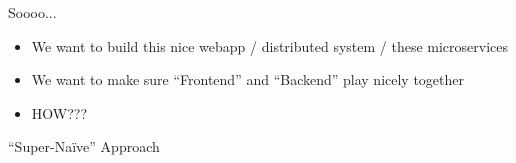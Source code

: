 \begin{frame}[fragile]{Soooo...}

\begin{itemize}

\item We want to build this nice webapp / distributed system / these microservices

\item We want to make sure ``Frontend'' and ``Backend'' play nicely together

\vspace{1.5em}
\item HOW???

\end{itemize}

\end{frame}

\begin{frame}[fragile]{}

\begin{center}
{\Huge
``Super-Na\"ive'' Approach
}
\end{center}

\end{frame}

